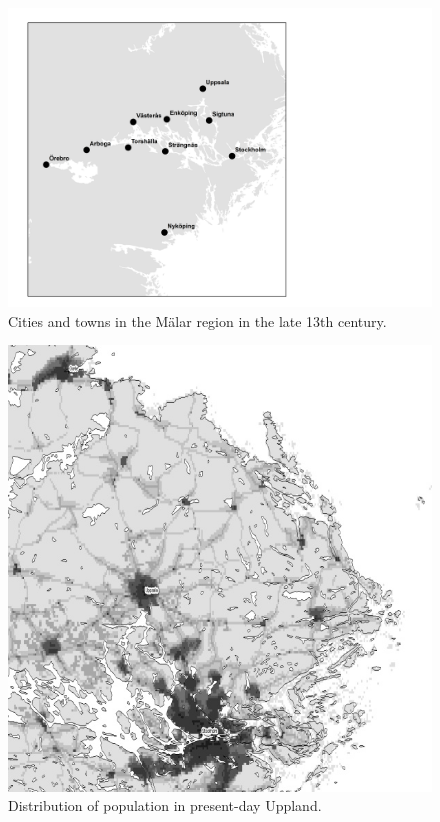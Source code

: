 \begin{figure}[h]
\includegraphics[height=.5\textheight]{figures/42_CitiesandTowns}
\caption{Cities and towns in the Mälar region  in the late 13th century. }
\label{map:37}
\end{figure}

\begin{figure}[h]
\includegraphics[height=.5\textheight]{figures/43_PopulationUppland}
\caption{Distribution of population in present-day Uppland.}
\label{map:39}
\end{figure}

